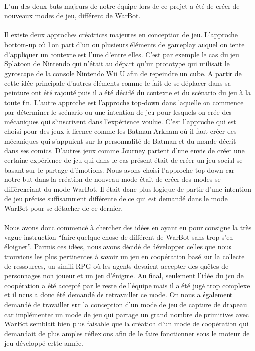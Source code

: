 \documentclass{report}
\begin{document}
\paragraph{}
  L’un des deux buts majeurs de notre équipe lors de ce projet a été de créer de nouveaux modes de jeu, différent de WarBot.
\paragraph{}
  Il existe deux approches créatrices majeures en conception de jeu. L’approche bottom-up où l’on part d’un ou plusieurs éléments de gameplay auquel on tente d’appliquer un contexte est l'une d'entre elles. C’est par exemple le cas du jeu Splatoon de Nintendo qui n’était au départ qu’un prototype qui utilisait le gyroscope de la console Nintendo Wii U afin de repeindre un cube. A partir de cette idée principale d’autres éléments comme le fait de se déplacer dans sa peinture ont été rajouté puis il a été décidé du contexte et du scénario du jeu à la toute fin. \newline
L’autre approche est l’approche top-down dans laquelle on commence par déterminer le scénario ou une intention de jeu pour lesquels on crée des mécaniques qui s’inscrivent dans l’expérience voulue. C’est l’approche qui est choisi pour des jeux à licence comme les Batman Arkham où il faut créer des mécaniques qui s’appuient sur la personnalité de Batman et du monde décrit dans ses comics. D’autres jeux comme Journey partent d’une envie de créer une certaine expérience de jeu qui dans le cas présent était de créer un jeu social se basant sur le partage d’émotions. \newline
Nous avons choisi l’approche top-down car notre but dans la création de nouveau mode était de créer des modes se différenciant du mode WarBot. Il était donc plus logique de partir d’une intention de jeu précise suffisamment différente de ce qui est demandé dans le mode WarBot pour se détacher de ce dernier.
\paragraph{}

  Nous avons donc commencé à chercher des idées en ayant eu pour consigne la très vague instruction “faire quelque chose de différent de WarBot sans trop s’en éloigner”. Parmis ces idées, nous avons décidé de développer celles que nous trouvions les plus pertinentes à savoir un jeu en coopération basé sur la collecte de ressources, un simili RPG où les agents devaient accepter des quêtes de personnages non joueur et un jeu d’énigme. \newline
Au final, seulement l’idée du jeu de coopération a été accepté par le reste de l’équipe mais il a été jugé trop complexe et il nous a donc été demandé de retravailler ce mode. On nous a également demandé de travailler sur la conception d’un mode de jeu de capture de drapeau car implémenter un mode de jeu qui partage un grand nombre de primitives avec WarBot semblait bien plus faisable que la création d’un mode de coopération qui demandait de plus amples réflexions afin de le faire fonctionner sous le moteur de jeu développé cette année.
\end{document}
